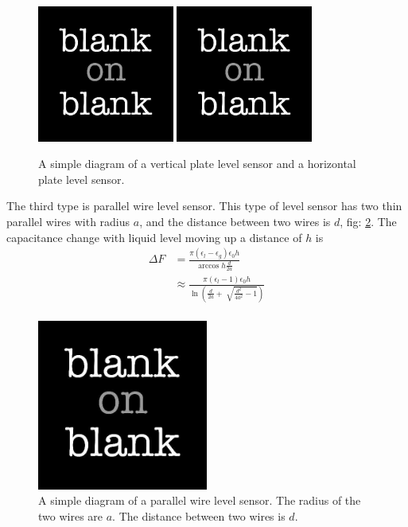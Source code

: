 \begin{figure}[h!]
  \centering
  \includegraphics[width=0.4\textwidth]
  {blank.jpg}
  \includegraphics[width=0.4\textwidth]
  {blank.jpg}
  \caption{A simple diagram of a vertical plate level sensor and a horizontal plate level sensor.}
  \label{fig: horizontal vertical level}
\end{figure}
The third type is parallel wire level sensor. This type of level sensor has two thin parallel wires with radius $a$, and the distance between two wires is $d$, fig: \ref{fig: parallel wire level}. The capacitance change with liquid level moving up a distance of $h$ is
\begin{align}
\Delta F & = \frac{\pi (\epsilon_l-\epsilon_g) \epsilon_0 h}{\arccos h \frac{d}{2a}}\\
& \approx \frac{\pi (\epsilon_l-1) \epsilon_0 h}{\ln(\frac{d}{2 a}+\sqrt[]{\frac{d^2}{4 a^2}-1})} \\
\end{align}
\begin{figure}[h!]
  \centering
  \includegraphics[width=0.5\textwidth]
  {blank.jpg}
  \caption{A simple diagram of a parallel wire level sensor. The radius of the two wires are $a$. The distance between two wires is $d$.}
  \label{fig: parallel wire level}
\end{figure}
